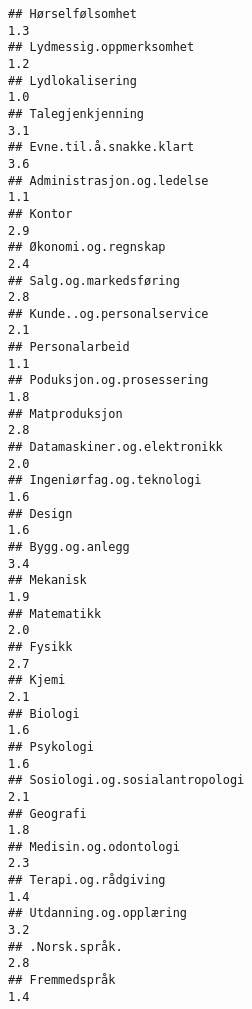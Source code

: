 \documentclass[
]{article}
\begin{document}
\begin{verbatim}
## Hørselfølsomhet                                                                  1.3
## Lydmessig.oppmerksomhet                                                          1.2
## Lydlokalisering                                                                  1.0
## Talegjenkjenning                                                                 3.1
## Evne.til.å.snakke.klart                                                          3.6
## Administrasjon.og.ledelse                                                        1.1
## Kontor                                                                           2.9
## Økonomi.og.regnskap                                                              2.4
## Salg.og.markedsføring                                                            2.8
## Kunde..og.personalservice                                                        2.1
## Personalarbeid                                                                   1.1
## Poduksjon.og.prosessering                                                        1.8
## Matproduksjon                                                                    2.8
## Datamaskiner.og.elektronikk                                                      2.0
## Ingeniørfag.og.teknologi                                                         1.6
## Design                                                                           1.6
## Bygg.og.anlegg                                                                   3.4
## Mekanisk                                                                         1.9
## Matematikk                                                                       2.0
## Fysikk                                                                           2.7
## Kjemi                                                                            2.1
## Biologi                                                                          1.6
## Psykologi                                                                        1.6
## Sosiologi.og.sosialantropologi                                                   2.1
## Geografi                                                                         1.8
## Medisin.og.odontologi                                                            2.3
## Terapi.og.rådgiving                                                              1.4
## Utdanning.og.opplæring                                                           3.2
## .Norsk.språk.                                                                    2.8
## Fremmedspråk                                                                     1.4

\end{verbatim}
\end{document}
